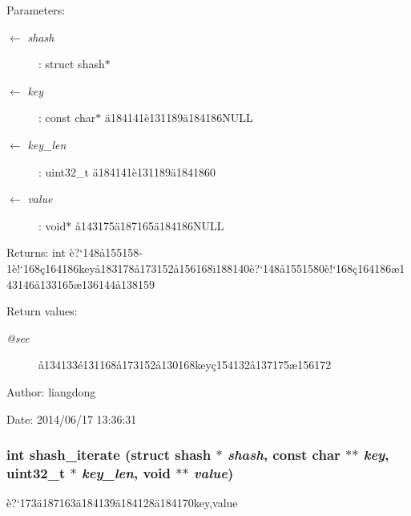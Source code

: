 \begin{Desc}
\item[Parameters:]
\begin{description}
\item[\mbox{$\leftarrow$} {\em shash}]: struct shash$\ast$ \item[\mbox{$\leftarrow$} {\em key}]: const char$\ast$ \"{a}184141\`{e}131189\"{a}184186NULL \item[\mbox{$\leftarrow$} {\em key\_\-len}]: uint32\_\-t \"{a}184141\`{e}131189\"{a}1841860 \item[\mbox{$\leftarrow$} {\em value}]: void$\ast$ \aa{}143175\"{a}187165\"{a}184186NULL \end{description}
\end{Desc}
\begin{Desc}
\item[Returns:]int \`{e}?`148\aa{}155158-1\`{e}!`168\c{c}164186key\aa{}183178\aa{}173152\aa{}156168\"{\i}188140\`{e}?`148\aa{}1551580\`{e}!`168\c{c}164186\ae{}143146\aa{}133165\ae{}136144\aa{}138159 \end{Desc}
\begin{Desc}
\item[Return values:]
\begin{description}
\item[{\em @see}]\aa{}134133\'{e}131168\aa{}173152\aa{}130168key\c{c}154132\aa{}137175\ae{}156172 \end{description}
\end{Desc}
\begin{Desc}
\item[Author:]liangdong \end{Desc}
\begin{Desc}
\item[Date:]2014/06/17 13:36:31 \end{Desc}
\subsubsection{\setlength{\rightskip}{0pt plus 5cm}int shash\_\-iterate (struct shash $\ast$ {\em shash}, const char $\ast$$\ast$ {\em key}, uint32\_\-t $\ast$ {\em key\_\-len}, void $\ast$$\ast$ {\em value})}\label{shash_8c_a12}


\`{e}?`173\"{a}187163\"{a}184139\"{a}184128\"{a}184170key,value 

